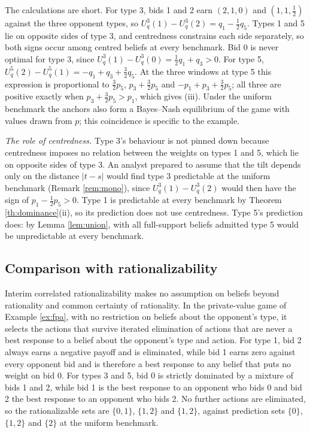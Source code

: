 \documentclass[12pt]{article}
\theoremstyle{definition}
\begin{document}
The calculations are short. For type 3, bids 1 and 2 earn $(2, 1, 0)$ and $(1, 1, \tfrac12)$ against the three opponent types, so $U^3_q(1) - U^3_q(2) = q_1 - \tfrac12 q_5$. Types 1 and 5 lie on opposite sides of type 3, and centredness constrains each side separately, so both signs occur among centred beliefs at every benchmark. Bid 0 is never optimal for type 3, since $U^3_q(1) - U^3_q(0) = \tfrac12 q_1 + q_3 > 0$. For type 5, $U^5_q(2) - U^5_q(1) = -q_1 + q_3 + \tfrac32 q_5$. At the three windows at type 5 this expression is proportional to $\tfrac32 p_5$, $p_3 + \tfrac32 p_5$ and $-p_1 + p_3 + \tfrac32 p_5$; all three are positive exactly when $p_3 + \tfrac32 p_5 > p_1$, which gives (iii). Under the uniform benchmark the anchors also form a Bayes--Nash equilibrium of the game with values drawn from $p$; this coincidence is specific to the example.

\emph{The role of centredness.} Type 3's behaviour is not pinned down because centredness imposes no relation between the weights on types 1 and 5, which lie on opposite sides of type 3. An analyst prepared to assume that the tilt depends only on the distance $|t-s|$ would find type 3 predictable at the uniform benchmark (Remark \ref{rem:mono}), since $U^3_q(1) - U^3_q(2)$ would then have the sign of $p_1 - \tfrac12 p_5 > 0$. Type 1 is predictable at every benchmark by Theorem \ref{th:dominance}(ii), so its prediction does not use centredness. Type 5's prediction does: by Lemma \ref{lem:union}, with all full-support beliefs admitted type 5 would be unpredictable at every benchmark.

\subsection{Comparison with rationalizability}\label{sec:rat}

Interim correlated rationalizability \citep{dfm2007icr} makes no assumption on beliefs beyond rationality and common certainty of rationality. In the private-value game of Example \ref{ex:fpa}, with no restriction on beliefs about the opponent's type, it selects the actions that survive iterated elimination of actions that are never a best response to a belief about the opponent's type and action. For type 1, bid 2 always earns a negative payoff and is eliminated, while bid 1 earns zero against every opponent bid and is therefore a best response to any belief that puts no weight on bid 0. For types 3 and 5, bid 0 is strictly dominated by a mixture of bids 1 and 2, while bid 1 is the best response to an opponent who bids 0 and bid 2 the best response to an opponent who bids 2. No further actions are eliminated, so the rationalizable sets are $\{0, 1\}$, $\{1, 2\}$ and $\{1, 2\}$, against prediction sets $\{0\}$, $\{1,2\}$ and $\{2\}$ at the uniform benchmark.
\end{document}
